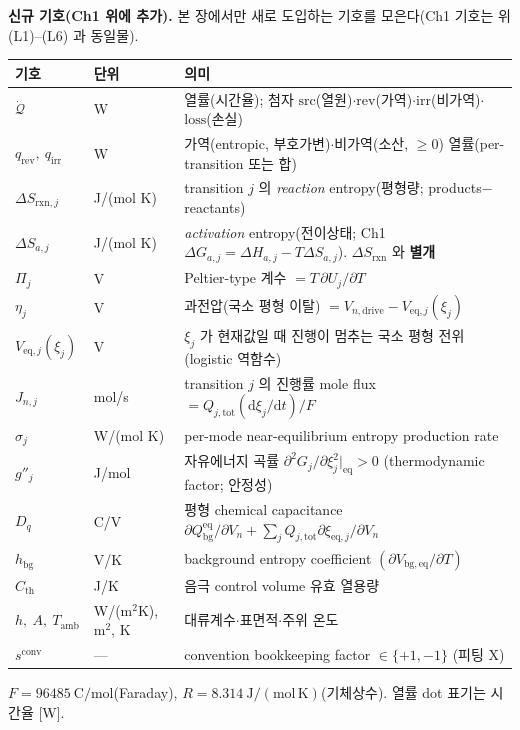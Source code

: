 \documentclass[11pt,a4paper]{article}
\newcommand{\dd}{\mathrm{d}}
\newcommand{\eq}{\mathrm{eq}}
\newcommand{\drive}{\mathrm{drive}}
\newcommand{\bg}{\mathrm{bg}}
\newcommand{\tot}{\mathrm{tot}}
\newcommand{\irr}{\mathrm{irr}}
\newcommand{\rev}{\mathrm{rev}}
\newcommand{\rxn}{\mathrm{rxn}}
\newcommand{\src}{\mathrm{src}}
\newcommand{\loss}{\mathrm{loss}}
\newcommand{\amb}{\mathrm{amb}}
\newcommand{\conv}{\mathrm{conv}}
\begin{document}
\textbf{신규 기호(Ch1 위에 추가).} 본 장에서만 새로 도입하는 기호를 모은다(Ch1 기호는 위 (L1)--(L6) 과 동일물).
\begin{longtable}{p{} p{} p{}}
\toprule 기호 & 단위 & 의미 \\ \midrule \endhead
$\dot{\mathcal Q}$ & W & 열률(시간율); 첨자 $\src$(열원)$\cdot$$\rev$(가역)$\cdot$$\irr$(비가역)$\cdot$$\loss$(손실) \\
$q_\rev,\ q_\irr$ & W & 가역(entropic, 부호가변)$\cdot$비가역(소산, $\ge0$) 열률(per-transition 또는 합) \\
$\Delta S_{\rxn,j}$ & J/(mol K) & transition $j$ 의 \emph{reaction} entropy(평형량; products$-$reactants) \\
$\Delta S_{a,j}$ & J/(mol K) & \emph{activation} entropy(전이상태; Ch1 $\Delta G_{a,j}=\Delta H_{a,j}-T\Delta S_{a,j}$). $\Delta S_{\rxn}$ 와 \textbf{별개} \\
$\Pi_j$ & V & Peltier-type 계수 $=T\,\partial U_j/\partial T$ \\
$\eta_j$ & V & 과전압(국소 평형 이탈) $=V_{n,\drive}-V_{\eq,j}(\xi_j)$ \\
$V_{\eq,j}(\xi_j)$ & V & $\xi_j$ 가 현재값일 때 진행이 멈추는 국소 평형 전위(logistic 역함수) \\
$J_{n,j}$ & mol/s & transition $j$ 의 진행률 mole flux $=Q_{j,\tot}(\dd\xi_j/\dd t)/F$ \\
$\sigma_j$ & W/(mol K) & per-mode near-equilibrium entropy production rate \\
$g''_j$ & J/mol & 자유에너지 곡률 $\partial^2 G_j/\partial\xi_j^2|_{\eq}>0$ (thermodynamic factor; 안정성) \\
$D_q$ & C/V & 평형 chemical capacitance $\partial Q_\bg^{\eq}/\partial V_n+\sum_jQ_{j,\tot}\partial\xi_{\eq,j}/\partial V_n$ \\
$h_\bg$ & V/K & background entropy coefficient $(\partial V_{\bg,\eq}/\partial T)$ \\
$C_{\mathrm{th}}$ & J/K & 음극 control volume 유효 열용량 \\
$h,\ A,\ T_\amb$ & W/(m$^2$K), m$^2$, K & 대류계수$\cdot$표면적$\cdot$주위 온도 \\
$s^{\conv}$ & --- & convention bookkeeping factor $\in\{+1,-1\}$ (피팅 X) \\
\bottomrule
\end{longtable}
$F=96485\ \mathrm{C/mol}$(Faraday), $R=8.314\ \mathrm{J/(mol\,K)}$(기체상수). 열률 dot 표기는 시간율 [W].

\end{document}
